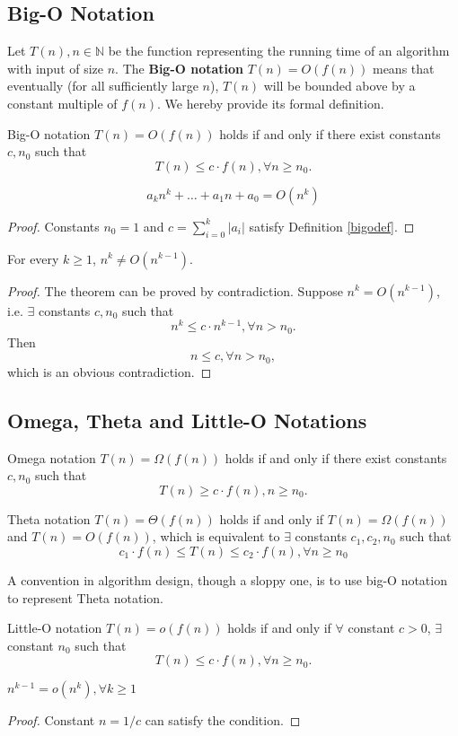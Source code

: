 \subsection{Big-O Notation}
Let $T(n),n\in\mathbb{N}$ be the function representing the running time of an algorithm with input of size $n$. The \textbf{Big-O notation} $T(n) = O(f(n))$ means that eventually (for all sufficiently large $n$), $T(n)$ will be bounded above by a constant multiple of $f(n)$. We hereby provide its formal definition.
\begin{definition}\label{bigodef}
Big-O notation $T(n)=O(f(n))$ holds if and only if there exist constants $c,n_0$ such that 
$$T(n)\leq c\cdot f(n),\forall n\geq n_0.$$
\end{definition}
\begin{theorem}
\begin{equation*}
a_kn^k+\dots+a_1n+a_0=O(n^k)
\end{equation*}
\end{theorem}
\begin{proof}
Constants $n_0=1$ and $c=\sum\limits_{i=0}^{k}\lvert a_i\rvert$ satisfy Definition \ref{bigodef}.
\end{proof}
\begin{theorem}
For every $k\geq 1$, $n^k\neq O(n^{k-1})$.
\end{theorem}
\begin{proof}
The theorem can be proved by contradiction. Suppose $n^k=O(n^{k-1})$, i.e. $\exists$ constants $c,n_0$ such that $$n^k\leq c\cdot n^{k-1}, \forall n>n_0.$$Then $$n\leq c,\forall n>n_0,$$which is an obvious contradiction. 
\end{proof}
\subsection{Omega, Theta and Little-O Notations}
\begin{definition}
Omega notation $T(n)=\Omega(f(n))$ holds if and only if there exist constants $c,n_0$ such that 
$$T(n)\geq c\cdot f(n),n\geq n_0.$$
\end{definition} 
\begin{definition}
Theta notation $T(n)=\Theta(f(n))$ holds if and only if $T(n)=\Omega(f(n))$ and $T(n)=O(f(n))$, which is equivalent to $\exists$ constants $c_1,c_2,n_0$ such that 
$$c_1\cdot f(n)\leq T(n)\leq c_2\cdot f(n),\forall n\geq n_0$$
\end{definition} 
A convention in algorithm design, though a sloppy one, is to use big-O notation to represent Theta notation. 
\begin{definition}
Little-O notation $T(n)=o(f(n))$ holds if and only if  $\forall$ constant $c>0$, $\exists$ constant $n_0$ such that 
$$T(n)\leq c\cdot f(n), \forall n\geq n_0.$$
\end{definition} 
\begin{theorem}
$n^{k-1}=o(n^k),\forall k\geq 1$
\end{theorem}
\begin{proof}
Constant $n=1/c$ can satisfy the condition.
\end{proof}
\ifx\PREAMBLE\undefined

\fi